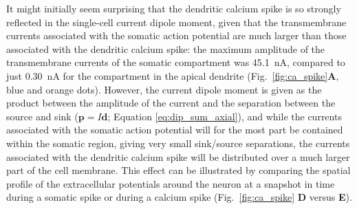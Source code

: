 \documentclass[preprint,10pt,authoryear]{elsarticle}
\begin{document}
It might initially seem surprising that the dendritic calcium spike is so strongly reflected in the single-cell current dipole moment, given that the transmembrane currents associated with the somatic action potential are much larger than those associated with the dendritic calcium spike: the maximum amplitude of the transmembrane currents of the somatic compartment was 45.1~$\si{\nA}$, compared to just 0.30~$\si{\nA}$ for the compartment in the apical dendrite (Fig.~\ref{fig:ca_spike}{\bf A}, blue and orange dots). 
However, the current dipole moment is given as the product between the amplitude of the current and the separation between the source and sink ($\mathbf{p}=I\mathbf{d}$; Equation \ref{eq:dip_sum_axial}), and while the currents associated with the somatic action potential will for the most part be contained within the somatic region, giving very small sink/source separations, the currents associated with the dendritic calcium spike will be distributed over a much larger part of the cell membrane.
This effect can be illustrated by comparing the spatial profile of the extracellular potentials around the neuron at a snapshot in time during a somatic spike or during a calcium spike (Fig.~\ref{fig:ca_spike} {\bf D} versus {\bf E}).
\end{document}
